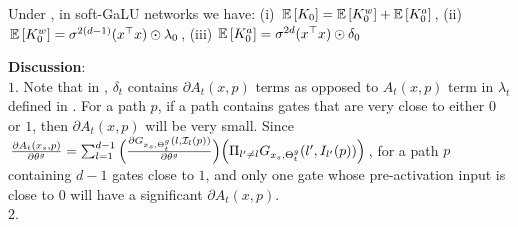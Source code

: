 \begin{lemma} Under , in soft-GaLU networks we have: (i) $\mathbb{E}\left[K_0\right]=\mathbb{E}\left[K^w_0\right]+\mathbb{E}\left[K^a_0\right]$, 
 (ii) $\mathbb{E}\left[K^w_0\right]=\sigma^{2(d-1)} (x^\top x)\odot \lambda_0$,  (iii) $\mathbb{E}\left[K^a_0\right]=\sigma^{2d}  (x^\top x)\odot \delta_0$
\end{lemma}
\textbf{Discussion}: \hfill\\
$1.$ Note that in , $\delta_t$ contains $\partial A_t(x,p)$ terms as opposed to $A_t(x,p)$ term in $\lambda_t$ defined in . For a path $p$, if a path contains gates that are very close to either $0$ or $1$, then $\partial A_t(x,p)$ will be very small. Since $\frac{\partial A_{t}(x_s,p)}{\partial \theta^g}= \sum_{l=1}^{d-1} \Big(\frac{\partial G_{x_s,{\Theta}^g_t}(l,\mathcal{I}_l(p))}{\partial \theta^g} \Big)\Big(\Pi_{l'\neq l} G_{x_s,{\Theta}^g_t}(l',I_{l'}(p))\Big)$, for a path $p$ containing $d-1$ gates close to $1$, and only one gate whose pre-activation input is close to $0$ will have a significant $\partial A_t(x,p)$. \hfill\\
$2.$ 

